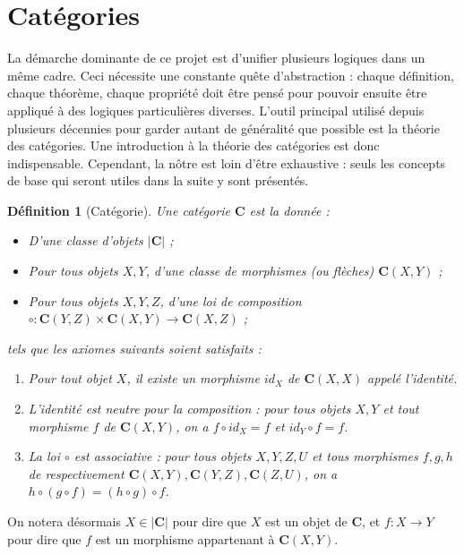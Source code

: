 \documentclass[11pt,a4paper]{article}
\newtheorem{defi}[theo]{Définition}
\newcommand{\itemz}{\item[$\triangleright$]}
\newcommand{\gr}{\textbf}
\newcommand{\1}{\mathbbm{1}}
\begin{document}
\section{Catégories}
La démarche dominante de ce projet est d'unifier plusieurs logiques dans un même cadre. Ceci nécessite une constante quête d'abstraction : chaque définition, chaque théorème, chaque propriété doit être pensé pour pouvoir ensuite être appliqué à des logiques particulières diverses. L'outil principal utilisé depuis plusieurs décennies pour garder autant de généralité que possible est la théorie des catégories. Une introduction à la théorie des catégories est donc indispensable. Cependant, la nôtre est loin d'être exhaustive : seuls les concepts de base qui seront utiles dans la suite y sont présentés.
\begin{defi}[Catégorie]
Une catégorie $\gr{C}$ est la donnée :
\begin{itemize}
\setlength\itemsep{-0.3em}
\itemz D'une classe d'objets $|\gr{C}|$ ;
\itemz Pour tous objets $X,Y$, d'une classe de morphismes (ou flèches) $\gr{C}(X,Y)$ ;
\itemz Pour tous objets $X,Y,Z$, d'une loi de composition $\circ : \gr{C}(Y,Z) \times \gr{C}(X,Y) \to \gr{C}(X,Z)$ ;
\end{itemize}
tels que les axiomes suivants soient satisfaits :
\begin{enumerate}
\setlength\itemsep{-0.3em}
\item[(i)] Pour tout objet $X$, il existe un morphisme $id_X$ de $\gr{C}(X,X)$ appelé l'identité.
\item[(ii)] L'identité est neutre pour la composition : pour tous objets $X,Y$ et tout morphisme $f$ de $\gr{C}(X,Y)$, on a  $f \circ id_X = f$ et $id_Y \circ f = f$.
\item[(iii)] La loi $\circ$ est associative : pour tous objets $X,Y,Z,U$ et tous morphismes $f,g,h$ de respectivement $\gr{C}(X,Y), \gr{C}(Y,Z), \gr{C}(Z,U)$, on a $h \circ (g \circ f) = (h \circ g) \circ f$.
\end{enumerate}
\end{defi}
On notera désormais $X \in |\gr{C}|$ pour dire que $X$ est un objet de $\gr{C}$, et $f : X \to Y$ pour dire que $f$ est un morphisme appartenant à $\gr{C}(X,Y)$.\\\\
\end{document}
